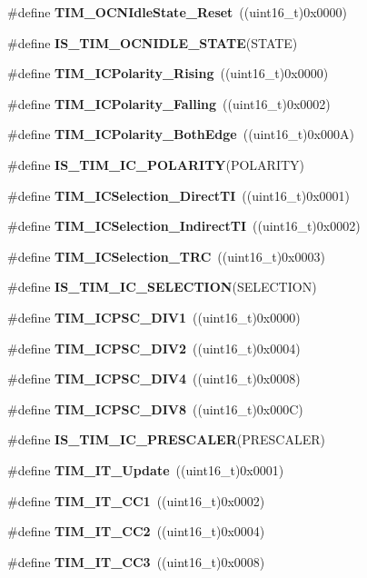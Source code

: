 \begin{DoxyCompactItemize}
\item 
\#define \textbf{ T\+I\+M\+\_\+\+O\+C\+N\+Idle\+State\+\_\+\+Reset}~((uint16\+\_\+t)0x0000)
\item 
\#define \textbf{ I\+S\+\_\+\+T\+I\+M\+\_\+\+O\+C\+N\+I\+D\+L\+E\+\_\+\+S\+T\+A\+TE}(S\+T\+A\+TE)
\item 
\#define \textbf{ T\+I\+M\+\_\+\+I\+C\+Polarity\+\_\+\+Rising}~((uint16\+\_\+t)0x0000)
\item 
\#define \textbf{ T\+I\+M\+\_\+\+I\+C\+Polarity\+\_\+\+Falling}~((uint16\+\_\+t)0x0002)
\item 
\#define \textbf{ T\+I\+M\+\_\+\+I\+C\+Polarity\+\_\+\+Both\+Edge}~((uint16\+\_\+t)0x000\+A)
\item 
\#define \textbf{ I\+S\+\_\+\+T\+I\+M\+\_\+\+I\+C\+\_\+\+P\+O\+L\+A\+R\+I\+TY}(P\+O\+L\+A\+R\+I\+TY)
\item 
\#define \textbf{ T\+I\+M\+\_\+\+I\+C\+Selection\+\_\+\+Direct\+TI}~((uint16\+\_\+t)0x0001)
\item 
\#define \textbf{ T\+I\+M\+\_\+\+I\+C\+Selection\+\_\+\+Indirect\+TI}~((uint16\+\_\+t)0x0002)
\item 
\#define \textbf{ T\+I\+M\+\_\+\+I\+C\+Selection\+\_\+\+T\+RC}~((uint16\+\_\+t)0x0003)
\item 
\#define \textbf{ I\+S\+\_\+\+T\+I\+M\+\_\+\+I\+C\+\_\+\+S\+E\+L\+E\+C\+T\+I\+ON}(S\+E\+L\+E\+C\+T\+I\+ON)
\item 
\#define \textbf{ T\+I\+M\+\_\+\+I\+C\+P\+S\+C\+\_\+\+D\+I\+V1}~((uint16\+\_\+t)0x0000)
\item 
\#define \textbf{ T\+I\+M\+\_\+\+I\+C\+P\+S\+C\+\_\+\+D\+I\+V2}~((uint16\+\_\+t)0x0004)
\item 
\#define \textbf{ T\+I\+M\+\_\+\+I\+C\+P\+S\+C\+\_\+\+D\+I\+V4}~((uint16\+\_\+t)0x0008)
\item 
\#define \textbf{ T\+I\+M\+\_\+\+I\+C\+P\+S\+C\+\_\+\+D\+I\+V8}~((uint16\+\_\+t)0x000\+C)
\item 
\#define \textbf{ I\+S\+\_\+\+T\+I\+M\+\_\+\+I\+C\+\_\+\+P\+R\+E\+S\+C\+A\+L\+ER}(P\+R\+E\+S\+C\+A\+L\+ER)
\item 
\#define \textbf{ T\+I\+M\+\_\+\+I\+T\+\_\+\+Update}~((uint16\+\_\+t)0x0001)
\item 
\#define \textbf{ T\+I\+M\+\_\+\+I\+T\+\_\+\+C\+C1}~((uint16\+\_\+t)0x0002)
\item 
\#define \textbf{ T\+I\+M\+\_\+\+I\+T\+\_\+\+C\+C2}~((uint16\+\_\+t)0x0004)
\item 
\#define \textbf{ T\+I\+M\+\_\+\+I\+T\+\_\+\+C\+C3}~((uint16\+\_\+t)0x0008)
\item 

\end{DoxyCompactItemize}
